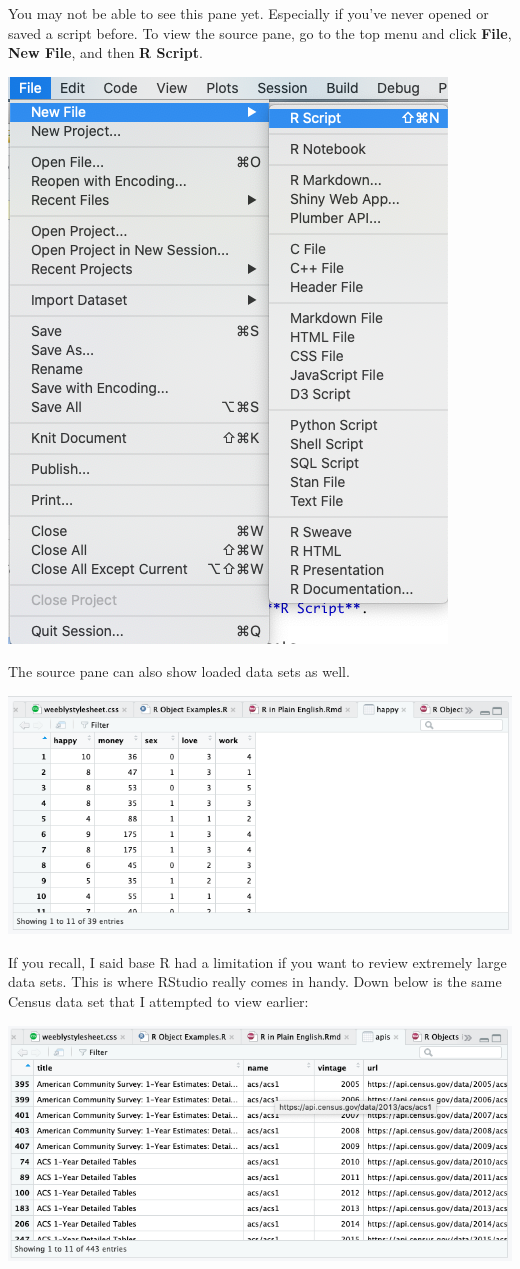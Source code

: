 \documentclass[
]{book}
\begin{document}
You may not be able to see this pane yet. Especially if you've never opened or saved a script before. To view the source pane, go to the top menu and click \textbf{File}, \textbf{New File}, and then \textbf{R Script}.

\begin{center}\includegraphics[width=0.65\linewidth]{1.14.1_New_R_Script} \end{center}

The source pane can also show loaded data sets as well.

\begin{center}\includegraphics[width=0.75\linewidth]{1.15_Data_Set} \end{center}

If you recall, I said base R had a limitation if you want to review extremely large data sets. This is where RStudio really comes in handy. Down below is the same Census data set that I attempted to view earlier:

\begin{center}\includegraphics[width=0.75\linewidth]{1.16_API_List} \end{center}
\end{document}

